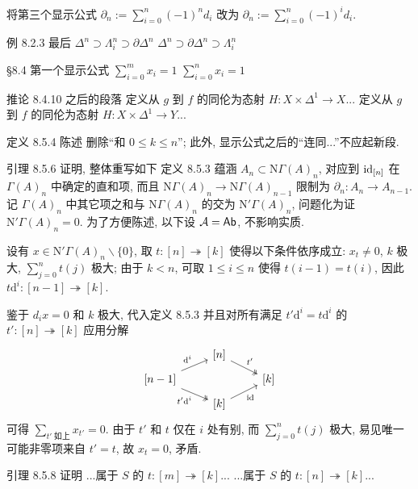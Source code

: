 \documentclass{AJerrata}
\begin{document}
\begin{Errata}
		将第三个显示公式 $\partial_n := \sum_{i=0}^n (-1)^n d_i$ 改为 $\partial_n := \sum_{i=0}^n (-1)^i d_i$.
		
		\item[例 8.2.3 最后]
		\Orig $\Delta^n \supset \Lambda^n_i \supset \partial \Delta^n$
		\Corr $\Delta^n \supset \partial \Delta^n \supset \Lambda^n_i$
		
		\item[\S 8.4 第一个显示公式]
		\Orig $\sum_{i=0}^m x_i = 1$
		\Corr $\sum_{i=0}^n x_i = 1$
		
		\item[推论 8.4.10 之后的段落]
		\Orig 定义从 $g$ 到 $f$ 的同伦为态射 $H: X \times \Delta^1 \to X$...
		\Corr 定义从 $g$ 到 $f$ 的同伦为态射 $H: X \times \Delta^1 \to Y$...
		
		\item[定义 8.5.4 陈述]
		删除``和 $0 \leq k \leq n$''; 此外, 显示公式之后的``连同...''不应起新段.
		
		\item[引理 8.5.6 证明, 整体重写如下]
		定义 8.5.3 蕴涵 $A_n \subset \mathrm{N}\Gamma(A)_n$, 对应到 $\mathrm{id}_{[n]}$ 在 $\Gamma(A)_n$ 中确定的直和项, 而且 $\mathrm{N}\Gamma(A)_n \to \mathrm{N}\Gamma(A)_{n-1}$ 限制为 $\partial_n: A_n \to A_{n-1}$. 记 $\Gamma(A)_n$ 中其它项之和与 $\mathrm{N}\Gamma(A)_n$ 的交为 $\mathrm{N}'\Gamma(A)_n$, 问题化为证 $\mathrm{N}'\Gamma(A)_n = 0$. 为了方便陈述, 以下设 $\mathcal{A} = \mathsf{Ab}$, 不影响实质.
		
		设有 $x \in \mathrm{N}'\Gamma(A)_n \smallsetminus \{0\}$, 取 $t: [n] \twoheadrightarrow [k]$ 使得以下条件依序成立: $x_t \neq 0$, $k$ 极大, $\sum_{j=0}^n t(j)$ 极大; 由于 $k < n$, 可取 $1 \leq i \leq n$ 使得 $t(i-1) = t(i)$, 因此 $t \mathrm{d}^i: [n-1] \twoheadrightarrow [k]$.
		
		鉴于 $d_i x = 0$ 和 $k$ 极大, 代入定义 8.5.3 并且对所有满足 $t' \mathrm{d}^i = t \mathrm{d}^i$ 的 $t': [n] \twoheadrightarrow [k]$ 应用分解
		\[\begin{tikzcd}[row sep=tiny]
			& {[n]} \arrow[twoheadrightarrow, rd, "{t'}"] & \\
			{[n-1]} \arrow[ru, "{\mathrm{d}^i}"] \arrow[twoheadrightarrow, rd, "{t'\mathrm{d}^i}"'] & & {[k]} \\
			& {[k]} \arrow[ru, "{\identity}"'] &
		\end{tikzcd}\]
		可得 $\sum_{t' \;\text{如上}} x_{t'} = 0$. 由于 $t'$ 和 $t$ 仅在 $i$ 处有别, 而 $\sum_{j=0}^n t(j)$ 极大, 易见唯一可能非零项来自 $t' = t$, 故 $x_t = 0$, 矛盾.
		
		\item[引理 8.5.8 证明]
		\Orig ...属于 $S$ 的 $t: [m] \twoheadrightarrow [k]$...
		\Corr ...属于 $S$ 的 $t: [n] \twoheadrightarrow [k]$...
		

\end{Errata}
\end{document}
